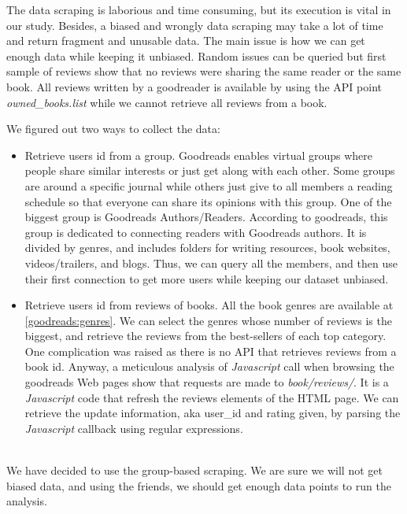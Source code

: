 \documentclass[11pt]{article}
\begin{document}
The data scraping is laborious and time consuming, but its execution is vital in our study. Besides, a biased and wrongly data scraping may take a lot of time and return fragment and unusable data.
The main issue is how we can get enough data while keeping it unbiased.
Random issues can be queried but first sample of reviews show that no reviews were sharing the same reader or the same book.
All reviews written by a goodreader is available by using the API point \textit{owned\_books.list} while we cannot retrieve all reviews from a book.


We figured out two ways to collect the data:
\begin{itemize}
\item Retrieve users id from a group.\newline
Goodreads enables virtual groups where people share similar interests or just get along with each other.
Some groups are around a specific journal while others just give to all members a reading schedule so that everyone can share its opinions with this group.
One of the biggest group is Goodreads Authors/Readers.
According to goodreads, this group is dedicated to connecting readers with Goodreads authors.
It is divided by genres, and includes folders for writing resources, book websites, videos/trailers, and blogs.
Thus, we can query all the members, and then use their first connection to get more users while keeping our dataset unbiased.
\item Retrieve users id from reviews of books.\newline
All the book genres are available at \ref{goodreads:genres}.
We can select the genres whose number of reviews is the biggest, and retrieve the reviews from the best-sellers of each top category.
One complication was raised as there is no API that retrieves reviews from a book id.
Anyway, a meticulous analysis of \textit{Javascript} call when browsing the goodreads Web pages show that requests are made to \textit{book/reviews/}.
It is a \textit{Javascript} code that refresh the reviews elements of the HTML page.
We can retrieve the update information, aka user_id and rating given, by  parsing the \textit{Javascript} callback using regular expressions.
\end{itemize}
\\

We have decided to use the group-based scraping.
We are sure we will not get biased data, and using the friends, we should get enough data points to run the analysis.
\end{document}
